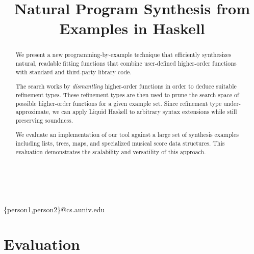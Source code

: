 \documentclass[pldi]{sigplanconf-pldi16}
\begin{document}
\title{Natural Program Synthesis from Examples in Haskell}

%
%

{ \\
  \\
}
{\{person1,person2\}@cs.auniv.edu}


\maketitle

\begin{abstract}
We present a new programming-by-example technique that efficiently synthesizes natural, readable fitting functions that combine user-defined higher-order functions with standard and third-party library code.

The search works by \textit{dismantling} higher-order functions in order to deduce suitable refinement types. These refinement types are then used to prune the search space of possible higher-order functions for a given example set. Since refinement type under-approximate, we can apply Liquid Haskell to arbitrary syntax extensions while still preserving soundness.

We evaluate an implementation of our tool against a large set of synthesis examples including lists, trees, maps, and specialized musical score data structures. This evaluation demonstrates the scalability and versatility of this approach.
\end{abstract}













\section{Evaluation}\label{evaluation}








\end{document}
